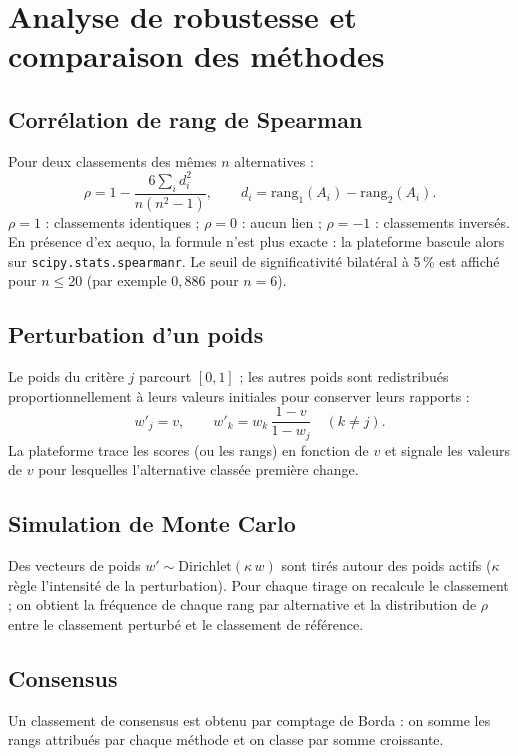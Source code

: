 \documentclass[11pt,a4paper]{report}
\theoremstyle{definition}
\theoremstyle{remark}
\begin{document}
\chapter{Analyse de robustesse et comparaison des méthodes}\label{ch:robustesse}

\section{Corrélation de rang de Spearman}
Pour deux classements des mêmes $n$ alternatives :
\begin{equation}
  \rho=1-\frac{6\sum_i d_i^2}{n(n^2-1)},\qquad d_i=\text{rang}_1(A_i)-\text{rang}_2(A_i).
\end{equation}
$\rho=1$ : classements identiques ; $\rho=0$ : aucun lien ; $\rho=-1$ : classements inversés. En présence
d'ex aequo, la formule n'est plus exacte : la plateforme bascule alors sur
\texttt{scipy.stats.spearmanr}. Le seuil de significativité bilatéral à 5\,\% est affiché pour
$n\le 20$ (par exemple $0{,}886$ pour $n=6$).

\section{Perturbation d'un poids}
Le poids du critère $j$ parcourt $[0,1]$ ; les autres poids sont redistribués proportionnellement à leurs
valeurs initiales pour conserver leurs rapports :
\begin{equation}
  w'_j=v,\qquad w'_k=w_k\,\frac{1-v}{1-w_j}\quad(k\ne j).
\end{equation}
La plateforme trace les scores (ou les rangs) en fonction de $v$ et signale les valeurs de $v$ pour
lesquelles l'alternative classée première change.

\section{Simulation de Monte Carlo}
Des vecteurs de poids $w'\sim\text{Dirichlet}(\kappa\,w)$ sont tirés autour des poids actifs ($\kappa$
règle l'intensité de la perturbation). Pour chaque tirage on recalcule le classement ; on obtient la
fréquence de chaque rang par alternative et la distribution de $\rho$ entre le classement perturbé et le
classement de référence.

\section{Consensus}
Un classement de consensus est obtenu par comptage de Borda : on somme les rangs attribués par chaque
méthode et on classe par somme croissante.
\end{document}
